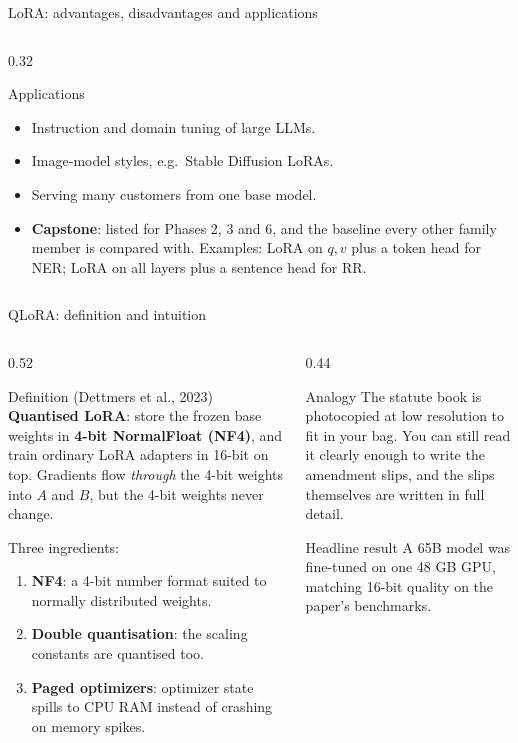 \documentclass[aspectratio=169,11pt]{beamer}
\begin{document}
\begin{frame}{LoRA: advantages, disadvantages and applications}
\begin{columns}[T]
\begin{column}{0.32\textwidth}
\begin{block}{Applications}
        \begin{itemize}
          \item Instruction and domain tuning of large LLMs.
          \item Image-model styles, e.g.\ Stable Diffusion LoRAs.
          \item Serving many customers from one base model.
          \item \textbf{Capstone}: listed for Phases 2, 3 and 6, and the baseline every other family member is compared with. Examples: LoRA on $q,v$ plus a token head for NER; LoRA on all layers plus a sentence head for RR.
        \end{itemize}
      \end{block}
    \end{column}
  \end{columns}
\end{frame}

\begin{frame}{QLoRA: definition and intuition}
  \begin{columns}[T]
    \begin{column}{0.52\textwidth}
      \begin{block}{Definition (Dettmers et al., 2023)}
        \small
        \textbf{Quantised LoRA}: store the frozen base weights in \textbf{4-bit NormalFloat (NF4)}, and train ordinary LoRA adapters in 16-bit on top.
        Gradients flow \emph{through} the 4-bit weights into $A$ and $B$, but the 4-bit weights never change.
      \end{block}
      \footnotesize
      Three ingredients:
      \begin{enumerate}
        \item \textbf{NF4}: a 4-bit number format suited to normally distributed weights.
        \item \textbf{Double quantisation}: the scaling constants are quantised too.
        \item \textbf{Paged optimizers}: optimizer state spills to CPU RAM instead of crashing on memory spikes.
      \end{enumerate}
    \end{column}
    \begin{column}{0.44\textwidth}
      \begin{exampleblock}{Analogy}
        \small
        The statute book is photocopied at low resolution to fit in your bag. You can still read it clearly enough to write the amendment slips, and the slips themselves are written in full detail.
      \end{exampleblock}
      \begin{block}{Headline result}
        \small
        A 65B model was fine-tuned on one 48 GB GPU, matching 16-bit quality on the paper's benchmarks.
      \end{block}
    \end{column}
  \end{columns}
\end{frame}
\end{document}
